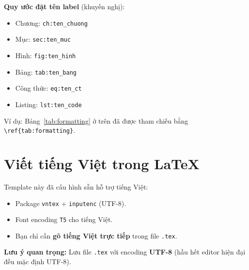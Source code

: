 \textbf{Quy ước đặt tên label} (khuyến nghị):
\begin{itemize}
  \item Chương: \texttt{ch:ten\_chuong}
  \item Mục: \texttt{sec:ten\_muc}
  \item Hình: \texttt{fig:ten\_hinh}
  \item Bảng: \texttt{tab:ten\_bang}
  \item Công thức: \texttt{eq:ten\_ct}
  \item Listing: \texttt{lst:ten\_code}
\end{itemize}

Ví dụ: Bảng~\ref{tab:formatting} ở trên đã được tham chiếu bằng \verb|\ref{tab:formatting}|.

\section{Viết tiếng Việt trong \LaTeX{}}

Template này đã cấu hình sẵn hỗ trợ tiếng Việt:
\begin{itemize}
  \item Package \texttt{vntex} + \texttt{inputenc} (UTF-8).
  \item Font encoding \texttt{T5} cho tiếng Việt.
  \item Bạn chỉ cần \textbf{gõ tiếng Việt trực tiếp} trong file \texttt{.tex}.
\end{itemize}

\textbf{Lưu ý quan trọng:} Lưu file \texttt{.tex} với encoding \textbf{UTF-8} (hầu hết editor hiện đại đều mặc định UTF-8).
